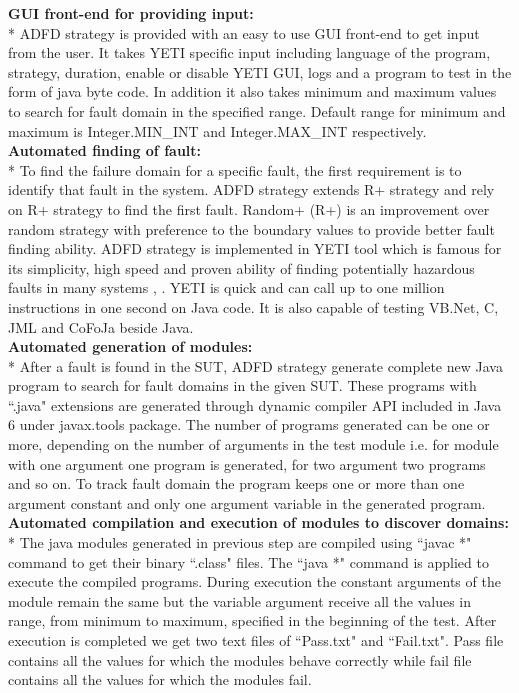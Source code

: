 \noindent \textbf{GUI front-end for providing input:}\\*
\indent ADFD strategy is provided with an easy to use GUI front-end to get input from the user. It takes YETI specific input including language of the program, strategy, duration, enable or disable YETI GUI, logs and a program to test in the form of java byte code. In addition it also takes minimum and maximum values to search for fault domain in the specified range. Default range for minimum and maximum is Integer.MIN\_INT and Integer.MAX\_INT respectively.\\

\noindent \textbf{Automated finding of fault:}\\*
\indent To find the failure domain for a specific fault, the first requirement is to identify that fault in the system. ADFD strategy extends R+ strategy and rely on R+ strategy to find the first fault. Random+ (R+) is an improvement over random strategy with preference to the boundary values to provide better fault finding ability. ADFD strategy is implemented in YETI tool which is famous for its simplicity, high speed and proven ability of finding potentially hazardous faults in many systems \cite{Oriol2011},  \cite{Oriol2012}. YETI is quick and can call up to one million instructions in one second on Java code. It is also capable of testing VB.Net, C, JML and CoFoJa beside Java. \\

\noindent \textbf{Automated generation of modules:}\\*
\indent  After a fault is found in the SUT, ADFD strategy generate complete new Java program to search for fault domains in the given SUT.  These programs with ``.java" extensions are generated through dynamic compiler API included in Java 6 under javax.tools package. The number of programs generated can be one or more, depending on the number of arguments in the test module i.e. for module with one argument one program is generated, for two argument two programs and so on. To track fault domain the program keeps one or more than one argument constant and only one argument variable in the generated program.\\

\noindent \textbf{Automated compilation and execution of modules to discover domains:}\\*
\indent  The java modules generated in previous step are compiled using ``javac *" command to get their binary ``.class" files. The ``java *" command is applied to execute the compiled programs. During execution the constant arguments of the module remain the same but the variable argument receive all the values in range, from minimum to maximum, specified in the beginning of the test. After execution is completed we get two text files of ``Pass.txt" and ``Fail.txt". Pass file contains all the values for which the modules behave correctly while fail file contains all the values for which the modules fail.\\

